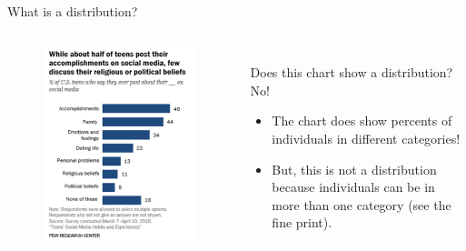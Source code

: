 \documentclass[aspectratio=169]{../latex_main/tntbeamer}  %
\begin{document}
	
	\begin{frame}{What is a distribution?}
	    \vspace{-1em}
	    \begin{columns}
	    
	        \begin{column}{.4\textwidth}
	              \begin{figure}
	                  \includegraphics[scale=.45]{Bild19}
	               \end{figure} 
	               
	        \end{column}
	        
	        \begin{column}{.6\textwidth}
	           
	              \\Does this chart show a distribution?\\
	              \bigskip
	              No!
	              \begin{itemize}
	                  \item The chart does show percents of individuals in different categories!
	                  \item But, this is not a distribution because individuals can be in more than one category (see the fine print).
	              \end{itemize}
	              
	        \end{column}
	        
	    \end{columns}
	\end{frame}
	
\end{document}
